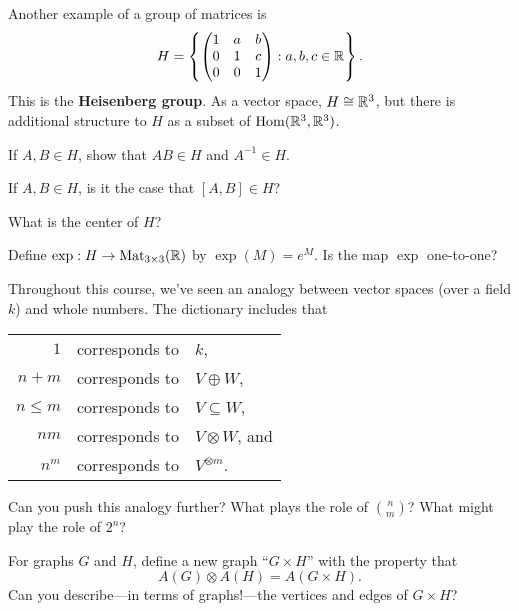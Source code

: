 \documentclass{homework}
\begin{document}
\begin{problem}
  Another example of a group of matrices is
  \[
    H = \left\{ \begin{pmatrix} 1 & a & b \\ 0 & 1 & c \\ 0 & 0 & 1 \end{pmatrix} : a, b, c \in \mathbb{R} \right\}.
  \]
  This is the \textbf{Heisenberg group}.  As a vector space, $H \cong \mathbb{R}^3$, but there is additional structure to $H$ as a subset of $\operatorname{Hom}(\mathbb{R}^3,\mathbb{R}^3)$.

  If $A, B \in H$, show that $AB \in H$ and $A^{-1} \in H$.
  
  If $A, B \in H$, is it the case that $[A,B] \in H$?
\end{problem}

\begin{problem}
  What is the center of $H$?
\end{problem}

\begin{problem}
  Define $\exp : H \to \operatorname{Mat}_{3\times 3}(\mathbb{R})$ by $\exp(M) = e^M$.
  Is the map $\exp$ one-to-one?
\end{problem}

\begin{problem}
  Throughout this course, we've seen an analogy between vector spaces
  (over a field $k$) and whole numbers.  The dictionary includes that
  \begin{center}\begin{tabular}{r@{ }l@{ }l}
    $1$  & corresponds to  & $k$, \\
    $n + m$ & corresponds to  & $V \oplus W$, \\
    $n \leq m$ & corresponds to  & $V \subseteq W$, \\
    $nm$ & corresponds to  & $V \otimes W$, and \\
    $n^m$ & corresponds to  & $V^{\otimes m}$.%
  \end{tabular}\end{center}
Can you push this analogy further?  What plays the role of
$\binom{n}{m}$?  What might play the role of $2^n$?
\end{problem}

\begin{problem}\label{tensor-of-graphs}For graphs $G$ and $H$, define a new graph ``$G \times H$'' with the property that
  \[
    A(G) \otimes A(H) = A(G \times H).
  \]
  Can you describe---in terms of graphs!---the vertices and edges of $G \times H$?
\end{problem}
\end{document}
